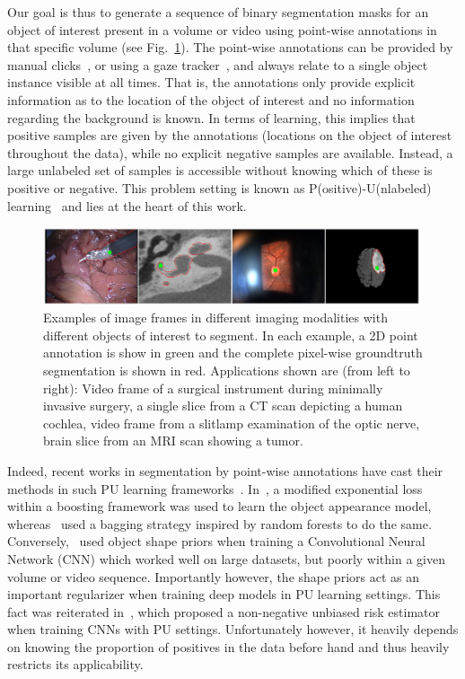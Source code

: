 Our goal is thus to generate a sequence of binary segmentation masks for an object of interest present in a volume or video using point-wise annotations in that specific volume (see Fig.~\ref{fig:intro}). The point-wise annotations can be provided by manual clicks~\cite{ferreira12,bearman16,lejeune18}, or using a gaze tracker~\cite{vilarino2007,khosravan16,lejeune17,lejeune18}, and always relate to a single object instance visible at all times. That is, the annotations only provide explicit information as to the location of the object of interest and no information regarding the background is known. In terms of learning, this implies that positive samples are given by the annotations (\ie locations on the object of interest throughout the data), while no explicit negative samples are available. Instead, a large unlabeled set of samples is accessible without knowing which of these is positive or negative. This problem setting is known as P(ositive)-U(nlabeled) learning~\cite{li03,li05,duplessis14,duplessis15} and lies at the heart of this work.

\begin{figure}[t]
\centering
\includegraphics[width=0.99\textwidth]{pics/intro.png}
\caption{Examples of image frames in different imaging modalities with different objects of interest to segment. In each example, a 2D point annotation is show in green and the complete pixel-wise groundtruth segmentation is shown in red. Applications shown are (from left to right): Video frame of a surgical instrument during minimally invasive surgery, a single slice from a CT scan depicting a human cochlea, video frame from a slitlamp examination of the optic nerve, brain slice from an MRI scan showing a tumor.}
\label{fig:intro}
\end{figure}

Indeed, recent works in segmentation by point-wise annotations have cast their methods in such PU learning frameworks~\cite{bearman16,lejeune17,lejeune18}. In~\cite{lejeune17}, a modified exponential loss within a boosting framework was used to learn the object appearance model, whereas~\cite{lejeune18} used a bagging strategy inspired by random forests to do the same. Conversely,~\cite{bearman16} used object shape priors when training a Convolutional Neural Network (CNN) which worked well on large datasets, but poorly within a given volume or video sequence. Importantly however, the shape priors act as an important regularizer when training deep models in PU learning settings. This fact was reiterated in~\cite{kiryo17}, which proposed a non-negative unbiased risk estimator when training CNNs with PU settings. Unfortunately however, it heavily depends on knowing the proportion of positives in the data before hand and thus heavily restricts its applicability.

